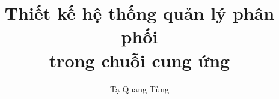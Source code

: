 \documentclass[a4paper,12pt,3p]{report}
\begin{document}
\title{\LARGE {\bf Thiết kế hệ thống quản lý phân phối \\ trong chuỗi cung ứng}\\
 \vspace*{7mm}
}

\author{Tạ Quang Tùng}

\normallinespacing
\maketitle

\preface



\body



% 
% 
% 
% 
% 

\appendix

\label{sect:bib}


%
%
\end{document}
